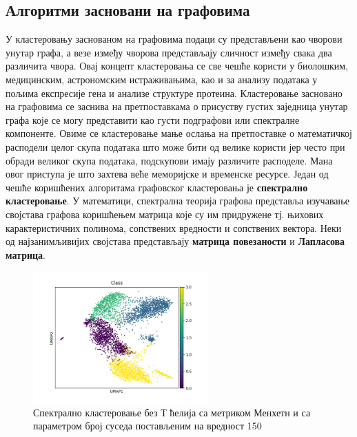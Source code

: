\documentclass[10pt, a4paper]{article}
\begin{document}
\subsection{Алгоритми засновани на графовима}
\label{subsec: podnaslov7}
У кластеровању заснованом на графовима подаци су представљени као чворови унутар графа, а везе између чворова представљају сличност између свака два различита чвора. Овај концепт кластеровања се све чешће користи у биолошким, медицинским, астрономским истраживањима, као и за анализу података у пољима експресије гена и анализе структуре протеина. Кластеровање засновано на графовима се заснива на претпоставкама о присуству густих заједница унутар графа које се могу представити као густи подграфови или спектралне компоненте. Овиме се кластеровање мање ослања на претпоставке о математичкој расподели целог скупа података што може бити од велике користи јер често при обради великог скупа података, подскупови имају различите расподеле. Мана овог приступа је што захтева веће меморијске и временске ресурсе. Један од чешће коришћених алгоритама графовског кластеровања је \textbf{спектрално кластеровање}. У математици, спектрална теорија графова представља изучавање својстава графова коришћењем матрица које су им придружене тј. њихових карактеристичних полинома, сопствених вредности и сопствених вектора. \cite{spektralno} Неки од најзанимљивијих својстава представљају \textbf{матрица повезаности} и \textbf{Лапласова матрица}.
\begin{figure}[H]
    \centering
    \captionsetup{justification=centering}
    \includegraphics[width=0.6\textwidth]{spectral_l1_150.png}
    \caption{Спектрално кластеровање без Т ћелија са метриком Менхетн и са параметром број суседа постављеним на вредност 150}
    \label{fig:gustina2}
\end{figure}
\end{document}
